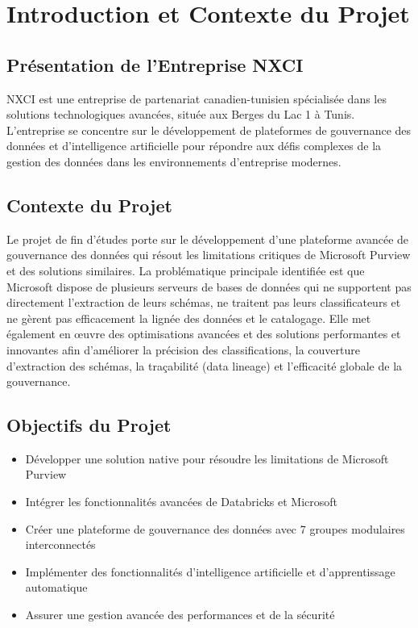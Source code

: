 \documentclass[12pt,a4paper]{article}
\begin{document}
\section{Introduction et Contexte du Projet}

\subsection{Présentation de l'Entreprise NXCI}
NXCI est une entreprise de partenariat canadien-tunisien spécialisée dans les solutions technologiques avancées, située aux Berges du Lac 1 à Tunis. L'entreprise se concentre sur le développement de plateformes de gouvernance des données et d'intelligence artificielle pour répondre aux défis complexes de la gestion des données dans les environnements d'entreprise modernes.

\subsection{Contexte du Projet}
Le projet de fin d'études porte sur le développement d'une plateforme avancée de gouvernance des données qui résout les limitations critiques de Microsoft Purview et des solutions similaires. La problématique principale identifiée est que Microsoft dispose de plusieurs serveurs de bases de données qui ne supportent pas directement l'extraction de leurs schémas, ne traitent pas leurs classificateurs et ne gèrent pas efficacement la lignée des données et le catalogage. Elle met également en œuvre des optimisations avancées et des solutions performantes et innovantes afin d'améliorer la précision des classifications, la couverture d'extraction des schémas, la traçabilité (data lineage) et l'efficacité globale de la gouvernance.

\subsection{Objectifs du Projet}
\begin{itemize}
    \item Développer une solution native pour résoudre les limitations de Microsoft Purview
    \item Intégrer les fonctionnalités avancées de Databricks et Microsoft
    \item Créer une plateforme de gouvernance des données avec 7 groupes modulaires interconnectés
    \item Implémenter des fonctionnalités d'intelligence artificielle et d'apprentissage automatique
    \item Assurer une gestion avancée des performances et de la sécurité
\end{itemize}
\end{document}
